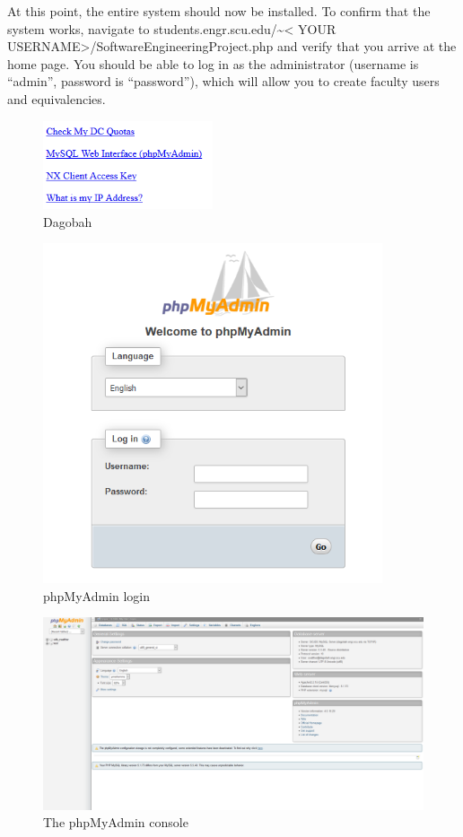 \documentclass{article}
\begin{document}
\par At this point, the entire system should now be installed. To confirm that
the system works, navigate to students.engr.scu.edu/\textasciitilde \textless
YOUR USERNAME\textgreater /SoftwareEngineeringProject.php and verify that you
arrive at the home page.  You should be able to log in as the administrator
(username is ``admin'', password is ``password''), which will allow you to
create faculty users and equivalencies.

\begin{figure}[h]
\includegraphics[width=5cm]{dagobah}
\centering
\caption{Dagobah}
\label{fig:dagobah}
\end{figure}

\begin{figure}[h]
\includegraphics[width=10cm]{phpmyadminlogin}
\centering
\caption{phpMyAdmin login}
\label{fig:phpmyadminlogin}
\end{figure}

\begin{figure}[h]
\includegraphics[width=15cm]{phpmyadmin}
\centering
\caption{The phpMyAdmin console}
\label{fig:phpmyadmin}
\end{figure}
\end{document}
